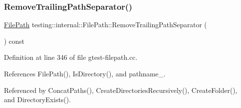 \mbox{\label{classtesting_1_1internal_1_1FilePath_ab47ada111cc940cf2359f6533bada6ca}} 
\subsubsection{\texorpdfstring{Remove\+Trailing\+Path\+Separator()}{RemoveTrailingPathSeparator()}}
{\footnotesize\ttfamily \hyperlink{classtesting_1_1internal_1_1FilePath}{File\+Path} testing\+::internal\+::\+File\+Path\+::\+Remove\+Trailing\+Path\+Separator (\begin{DoxyParamCaption}{ }\end{DoxyParamCaption}) const}



Definition at line 346 of file gtest-\/filepath.\+cc.



References File\+Path(), Is\+Directory(), and pathname\+\_\+.



Referenced by Concat\+Paths(), Create\+Directories\+Recursively(), Create\+Folder(), and Directory\+Exists().


